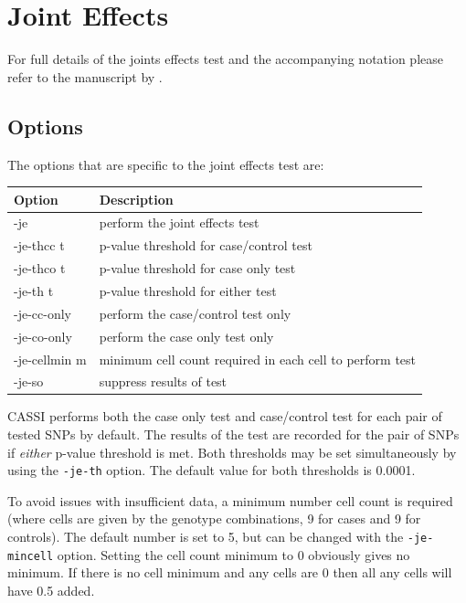 \documentclass[a4paper,12pt]{article}
\newcommand{\code}[1]{{\footnotesize{{\tt #1}}}}
\begin{document}
\section{Joint Effects}
\label{joint-effects}

For full details of the joints effects test and the accompanying notation please refer to the manuscript by \citet{ueki:etal:12}. 
\subsection{Options}
\label{je-options}

The options that are specific to the joint effects test are: 

{\begin{center}\begin{tabular}{ll}
Option  & Description\\
\hline
-je  & perform the joint effects test\\
-je-thcc t  & p-value threshold for case/control test\\
-je-thco t  & p-value threshold for case only test\\
-je-th t  & p-value threshold for either test\\
-je-cc-only  & perform the case/control test only\\
-je-co-only  & perform the case only test only\\
-je-cellmin m  & minimum cell count required in each cell to perform test\\
-je-so  & suppress results of test\\
\end{tabular}\end{center}}

CASSI performs both the case only test and case/control test for each pair of tested SNPs by default. The results of the test are recorded for the pair of SNPs if {\it either} p-value threshold is met. Both thresholds may be set simultaneously by using the \code{-je-th} option. The default value for both thresholds is 0.0001. 

To avoid issues with insufficient data, a minimum number cell count is required (where cells are given by the genotype combinations, 9 for cases and 9 for controls). The default number is set to 5, but can be changed with the \code{-je-mincell} option. Setting the cell count minimum to 0 obviously gives no minimum. If there is no cell minimum and any cells are 0 then all any cells will have 0.5 added. 
\end{document}

